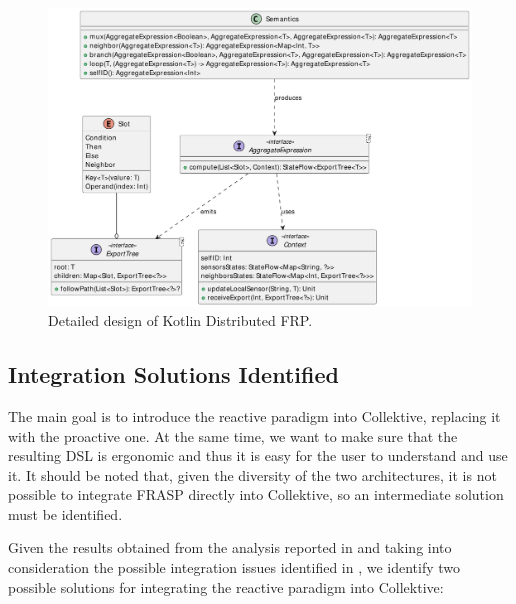 \begin{figure}
    \centering
    \includegraphics[width=\linewidth]{figures/kotlin-distributed-frp-design.pdf}
    \caption{Detailed design of Kotlin Distributed FRP.}
    \label{fig:kotlin-distributed-frp-design}
\end{figure}



\subsection{Integration Solutions Identified}

The main goal is to introduce the reactive paradigm into Collektive, replacing it with the proactive one. At the same time, we want to make sure that the resulting DSL is ergonomic and thus it is easy for the user to understand and use it. It should be noted that, given the diversity of the two architectures, it is not possible to integrate FRASP directly into Collektive, so an intermediate solution must be identified.

Given the results obtained from the analysis reported in  and taking into consideration the possible integration issues identified in , we identify two possible solutions for integrating the reactive paradigm into Collektive:

